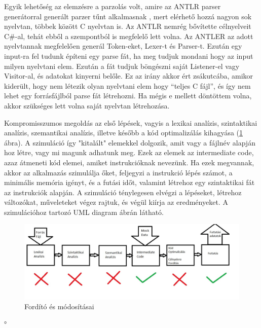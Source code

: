 Egyik lehetőség az elemzésre a parzolás volt, amire az ANTLR parser generátorral generált parzer tűnt alkalmasnak \cite{antlr}, mert elérhető hozzá nagyon sok nyelvtan, többek között C nyelvtan is. Az ANTLR nemrég bővítette célnyelveit C{\#}-al, tehát ebből a szempontból is megfelelő lett volna. Az ANTLER az adott nyelvtannak megfelelően generál Token-eket, Lexer-t és Parser-t. Ezután egy input-ra fel tudunk építeni egy parse fát, ha meg tudjuk mondani hogy az input milyen nyelvtani elem. Ezután a fát tudjuk böngészni saját Listener-el vagy Visitor-al, és adatokat kinyerni belőle. Ez az irány akkor ért zsákutcába, amikor kiderült, hogy nem létezik olyan nyelvtani elem hogy “teljes C fájl”, és így nem lehet egy forrásfájlból parse fát létrehozni. Ha mégis e mellett döntöttem volna, akkor szükséges lett volna saját nyelvtan létrehozása.

Kompromisszumos megoldás az első lépések, vagyis a lexikai analízis, szintaktikai analízis, szemantikai analízis, illetve később a kód optimalizálás kihagyása (\ref{fig:compiler} ábra). A szimuláció így "kitalált" elemekkel dolgozik, amit vagy a fájlnév alapján hoz létre, vagy mi magunk adhatunk meg. Ezek az elemek az intermediate code, azaz átmeneti kód elemei, amiket instrukcióknak nevezünk. Ha ezek megvannak, akkor az alkalmazás szimulálja őket, feljegyzi a instrukció lépés számot, a minimális memória igényt, és a futási időt, valamint létrehoz egy szintaktikai fát az instrukciók alapján. A szimuláció ténylegesen elvégzi a lépéseket, létrehoz változókat, műveleteket végez rajtuk, és végül kiírja az eredményeket. A szimulációhoz tartozó UML diagram  ábrán látható.



\begin{figure}[h]
\centering
\includegraphics[scale=0.4]{images/Compiler.jpg}
\caption{Fordító és módosításai}
\label{fig:compiler}
\end{figure}



°%

